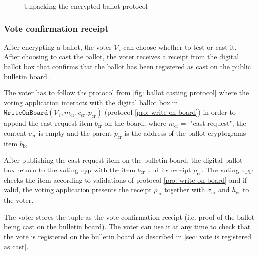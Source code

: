 \begin{landscape}
\begin{figure}[ht]
    \caption{Unpacking the encrypted ballot protocol}
    \label{fig: unpacking the encrypted ballot protocol}
\end{figure}
\end{landscape}


\clearpage
\subsubsection{Vote confirmation receipt} \label{sec: vote confirmation receipt}
After encrypting a ballot, the voter $\mathcal{V}_i$ can choose whether to test or cast it. After choosing to cast the ballot, the voter receives a receipt from the digital ballot box that confirms that the ballot has been registered as cast on the public bulletin board. 

The voter has to follow the protocol from \cref{fig: ballot casting protocol} where the voting application interacts with the digital ballot box in $\mathtt{WriteOnBoard}(\mathcal{V}_i, m_\mathrm{cr}, c_\mathrm{cr}, p_\mathrm{cr})$ (protocol \ref{pro: write on board}) in order to append the cast request item $b_\mathrm{cr}$ on the board, where $m_\mathrm{cr} =$ "cast request", the content $c_\mathrm{cr}$ is empty and the parent $p_\mathrm{cr}$ is the address of the ballot cryptograms item $b_\mathrm{bc}$.

After publishing the cast request item on the bulletin board, the digital ballot box return to the voting app with the item $b_\mathrm{cr}$ and its receipt $\rho_\mathrm{cr}$. The voting app checks the item according to validations of protocol \ref{pro: write on board} and if valid, the voting application presents the receipt $\rho_\mathrm{cr}$ together with $\sigma_\mathrm{cr}$ and $h_\mathrm{cr}$ to the voter.

The voter stores the tuple as the vote confirmation receipt (i.e. proof of the ballot being cast on the bulletin board). The voter can use it at any time to check that the vote is registered on the bulletin board as described in \cref{sec: vote is registered as cast}.

